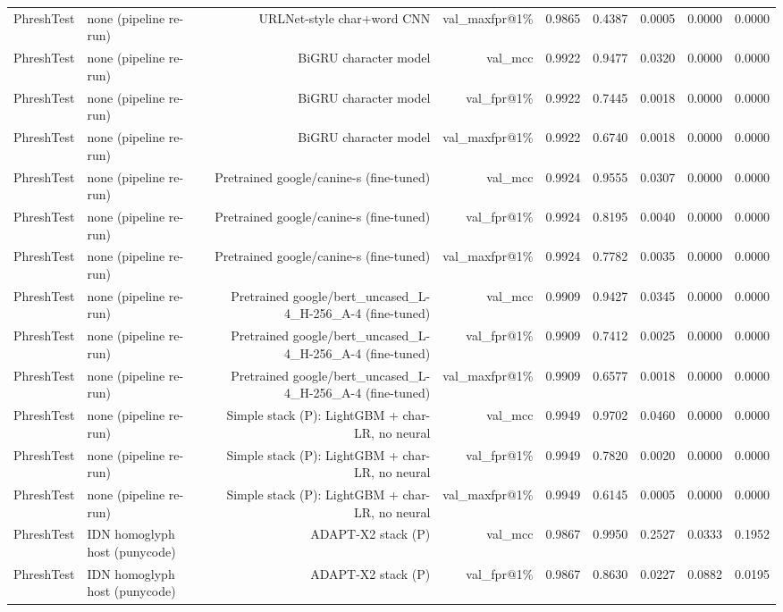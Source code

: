 \begin{table}[t]
\begin{tabular}{llrrrrrrr}
PhreshTest & none (pipeline re-run) & URLNet-style char+word CNN & val\_maxfpr@1\% & 0.9865 & 0.4387 & 0.0005 & 0.0000 & 0.0000 \\
PhreshTest & none (pipeline re-run) & BiGRU character model & val\_mcc & 0.9922 & 0.9477 & 0.0320 & 0.0000 & 0.0000 \\
PhreshTest & none (pipeline re-run) & BiGRU character model & val\_fpr@1\% & 0.9922 & 0.7445 & 0.0018 & 0.0000 & 0.0000 \\
PhreshTest & none (pipeline re-run) & BiGRU character model & val\_maxfpr@1\% & 0.9922 & 0.6740 & 0.0018 & 0.0000 & 0.0000 \\
PhreshTest & none (pipeline re-run) & Pretrained google/canine-s (fine-tuned) & val\_mcc & 0.9924 & 0.9555 & 0.0307 & 0.0000 & 0.0000 \\
PhreshTest & none (pipeline re-run) & Pretrained google/canine-s (fine-tuned) & val\_fpr@1\% & 0.9924 & 0.8195 & 0.0040 & 0.0000 & 0.0000 \\
PhreshTest & none (pipeline re-run) & Pretrained google/canine-s (fine-tuned) & val\_maxfpr@1\% & 0.9924 & 0.7782 & 0.0035 & 0.0000 & 0.0000 \\
PhreshTest & none (pipeline re-run) & Pretrained google/bert\_uncased\_L-4\_H-256\_A-4 (fine-tuned) & val\_mcc & 0.9909 & 0.9427 & 0.0345 & 0.0000 & 0.0000 \\
PhreshTest & none (pipeline re-run) & Pretrained google/bert\_uncased\_L-4\_H-256\_A-4 (fine-tuned) & val\_fpr@1\% & 0.9909 & 0.7412 & 0.0025 & 0.0000 & 0.0000 \\
PhreshTest & none (pipeline re-run) & Pretrained google/bert\_uncased\_L-4\_H-256\_A-4 (fine-tuned) & val\_maxfpr@1\% & 0.9909 & 0.6577 & 0.0018 & 0.0000 & 0.0000 \\
PhreshTest & none (pipeline re-run) & Simple stack (P): LightGBM + char-LR, no neural & val\_mcc & 0.9949 & 0.9702 & 0.0460 & 0.0000 & 0.0000 \\
PhreshTest & none (pipeline re-run) & Simple stack (P): LightGBM + char-LR, no neural & val\_fpr@1\% & 0.9949 & 0.7820 & 0.0020 & 0.0000 & 0.0000 \\
PhreshTest & none (pipeline re-run) & Simple stack (P): LightGBM + char-LR, no neural & val\_maxfpr@1\% & 0.9949 & 0.6145 & 0.0005 & 0.0000 & 0.0000 \\
PhreshTest & IDN homoglyph host (punycode) & ADAPT-X2 stack (P) & val\_mcc & 0.9867 & 0.9950 & 0.2527 & 0.0333 & 0.1952 \\
PhreshTest & IDN homoglyph host (punycode) & ADAPT-X2 stack (P) & val\_fpr@1\% & 0.9867 & 0.8630 & 0.0227 & 0.0882 & 0.0195 \\

\end{tabular}
\end{table}
